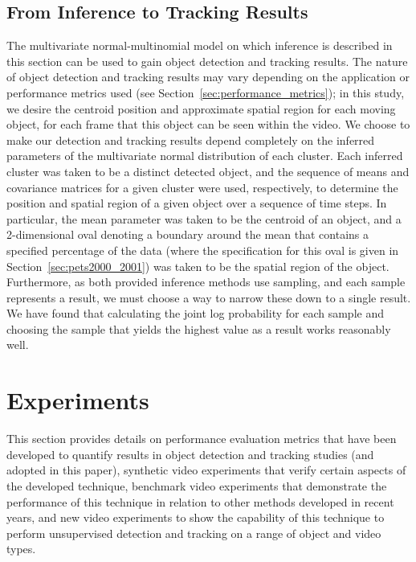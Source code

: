 \documentclass[twocolumn, final]{svjour3}
\begin{document}


\subsection{From Inference to Tracking Results}
\label{sec:inference_to_results}
The multivariate normal-multinomial model on which inference is described in this section can be used to gain object detection and tracking results. The nature of object detection and tracking results may vary depending on the application or performance metrics used (see Section~\ref{sec:performance_metrics}); in this study, we desire the centroid position and approximate spatial region for each moving object, for each frame that this object can be seen within the video. We choose to make our detection and tracking results depend completely on the inferred parameters of the multivariate normal distribution of each cluster. Each inferred cluster was taken to be a distinct detected object, and the sequence of means and covariance matrices for a given cluster were used, respectively, to determine the position and spatial region of a given object over a sequence of time steps. In particular, the mean parameter was taken to be the centroid of an object, and a 2-dimensional oval denoting a boundary around the mean that contains a specified percentage of the data (where the specification for this oval is given in Section~\ref{sec:pets2000_2001}) was taken to be the spatial region of the object. Furthermore, as both provided inference methods use sampling, and each sample represents a result, we must choose a way to narrow these down to a single result. We have found that calculating the joint log probability for each sample and choosing the sample that yields the highest value as a result works reasonably well.







\section{Experiments}
\label{sec:experiments}

This section provides details on performance evaluation metrics that have been developed to quantify results in object detection and tracking studies (and adopted in this paper), synthetic video experiments that verify certain aspects of the developed technique, benchmark video experiments that demonstrate the performance of this technique in relation to other methods developed in recent years, and new video experiments to show the capability of this technique to perform unsupervised detection and tracking on a range of object and video types.   
\end{document}
